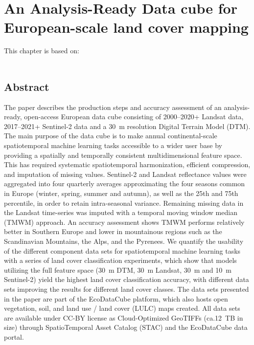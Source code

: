 \chapter[Analysis-Ready Data cube]{An Analysis-Ready Data cube for European-scale land cover mapping}
\label{cha:chapter2}
\vspace*{\fill}
This chapter is based on:
\\
\\
\newpage

\section*{Abstract}
The paper describes the production steps and accuracy assessment of an analysis-ready, open-access European data cube consisting of 2000--2020+ Landsat data, 2017--2021+ Sentinel-2 data and a 30~m resolution Digital Terrain Model (DTM). The main purpose of the data cube is to make annual continental-scale spatiotemporal machine learning tasks accessible to a wider user base by providing a spatially and temporally consistent multidimensional feature space. This has required systematic spatiotemporal harmonization, efficient compression, and imputation of missing values. Sentinel-2 and Landsat reflectance values were aggregated into four quarterly averages approximating the four seasons common in Europe (winter, spring, summer and autumn), as well as the 25th and 75th percentile, in order to retain intra-seasonal variance. Remaining missing data in the Landsat time-series was imputed with a temporal moving window median (TMWM) approach.  An accuracy assessment shows TMWM performs relatively better in Southern Europe and lower in mountainous regions such as the Scandinavian Mountains, the Alps, and the Pyrenees. We quantify the usability of the different component data sets for spatiotemporal machine learning tasks with a series of land cover classification experiments, which show that models utilizing the full feature space (30~m DTM, 30~m Landsat, 30~m and 10~m Sentinel-2) yield the highest land cover classification accuracy, with different data sets improving the results for different land cover classes. The data sets presented in the paper are part of the EcoDataCube platform, which also hosts open vegetation, soil, and land use / land cover (LULC) maps created. All data sets are available under CC-BY license as Cloud-Optimized GeoTIFFs (ca.\@ 12~TB in size) through SpatioTemporal Asset Catalog (STAC) and the EcoDataCube data portal.

